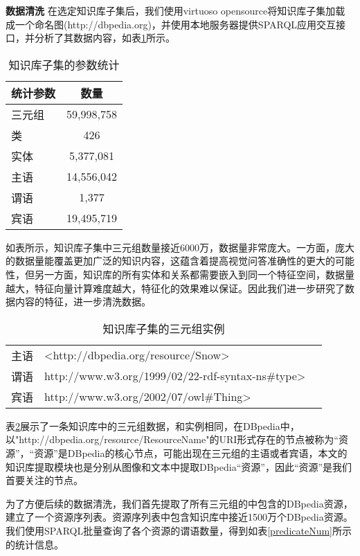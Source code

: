 \textbf{数据清洗}\qquad
在选定知识库子集后，我们使用virtuoso opensource将知识库子集加载成一个命名图(http://dbpedia.org)，并使用本地服务器提供SPARQL应用交互接口，并分析了其数据内容，如表\ref{dbpediaPara}所示。
\begin{table}[H]
\centering
\caption{知识库子集的参数统计}
\begin{tabular}{lc}
\toprule
统计参数 & 数量\\
\midrule
三元组 &  59,998,758\\
类 &  426\\
实体 & 5,377,081 \\
主语 & 14,556,042 \\
谓语 & 1,377 \\
宾语 & 19,495,719 \\
\bottomrule
\end{tabular}
\label{dbpediaPara}
\end{table}

如表所示，知识库子集中三元组数量接近6000万，数据量非常庞大。一方面，庞大的数据量能覆盖更加广泛的知识内容，这蕴含着提高视觉问答准确性的更大的可能性，但另一方面，知识库的所有实体和关系都需要嵌入到同一个特征空间，数据量越大，特征向量计算难度越大，特征化的效果难以保证。因此我们进一步研究了数据内容的特征，进一步清洗数据。

\begin{table}[H]
\centering
\caption{知识库子集的三元组实例}
\begin{tabular}{lll}
\toprule
主语 & <http://dbpedia.org/resource/Snow> \\
谓语 & http://www.w3.org/1999/02/22-rdf-syntax-ns\#type> \\
宾语 & http://www.w3.org/2002/07/owl\#Thing>\\
\bottomrule
\end{tabular}
\label{dbpediasamples}
\end{table}

表\ref{dbpediasamples}展示了一条知识库中的三元组数据，和实例相同，在DBpedia中，以"http://dbpedia.org/resource/ResourceName"的URI形式存在的节点被称为“资源”，“资源”是DBpedia的核心节点，可能出现在三元组的主语或者宾语，本文的知识库提取模块也是分别从图像和文本中提取DBpedia“资源”，因此“资源”是我们首要关注的节点。

为了方便后续的数据清洗，我们首先提取了所有三元组的中包含的DBpedia资源，建立了一个资源序列表。资源序列表中包含知识库中接近1500万个DBpedia资源。我们使用SPARQL批量查询了各个资源的谓语数量，得到如表\ref{predicateNum}所示的统计信息。

